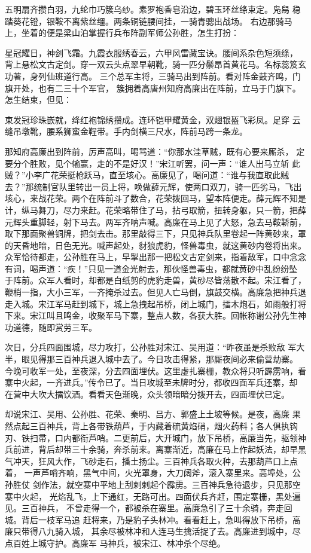 五明扇齐攒白羽，九纶巾巧簇乌纱。素罗袍香皂沿边，碧玉环丝绦束定。凫舄
稳踏葵花镫，银鞍不离紫丝缰。两条铜链腰间挂，一骑青骢出战场。
右边那骑马上，坐着的便是梁山泊掌握行兵布阵副军师公孙胜，怎生打扮：

星冠耀日，神剑飞霜。九霞衣服绣春云，六甲风雷藏宝诀。腰间系杂色短须绦，
背上悬松文古定剑。穿一双云头点翠早朝靴，骑一匹分鬃昂首黄花马。名标蕊笈玄
功著，身列仙班道行高。
三个总军主将，三骑马出到阵前。看对阵金鼓齐鸣，门旗开处，也有二三十个军官，
簇拥着高唐州知府高廉出在阵前，立马于门旗下。怎生结束，但见：

束发冠珍珠嵌就，绛红袍锦绣攒成。连环铠甲耀黄金，双翅银盔飞彩凤。足穿
云缝吊墩靴，腰系狮蛮金鞓带。手内剑横三尺水，阵前马跨一条龙。

那知府高廉出到阵前，厉声高叫，喝骂道：“你那水洼草贼，既有心要来厮杀，
定要分个胜败，见个输赢，走的不是好汉！”宋江听罢，问一声：“谁人出马立斩
此贼？”小李广花荣挺枪跃马，直至垓心。高廉见了，喝问道：“谁与我直取此贼
去？”那统制官队里转出一员上将，唤做薛元辉，使两口双刀，骑一匹劣马，飞出
垓心，来战花荣。两个在阵前斗了数合，花荣拨回马，望本阵便走。薛元辉不知是
计，纵马舞刀，尽力来赶。花荣略带住了马，拈弓取箭，扭转身躯，只一箭，把薛
元辉头重脚轻，射下马去。两军齐呐声喊。高廉在马上见了大怒，急去马鞍鞒前，
取下那面聚兽铜牌，把剑去击。那里敲得三下，只见神兵队里卷起一阵黄砂来，罩
的天昏地暗，日色无光。喊声起处，豺狼虎豹，怪兽毒虫，就这黄砂内卷将出来。
众军恰待都走，公孙胜在马上，早掣出那一把松文古定剑来，指着敌军，口中念念
有词，喝声道：“疾！”只见一道金光射去，那伙怪兽毒虫，都就黄砂中乱纷纷坠
于阵前。众军人看时，却都是白纸剪的虎豹走兽，黄砂尽皆荡散不起。宋江看了，
鞭梢一指，大小三军，一齐掩杀过去。但见人亡马倒，旗鼓交横。高廉急把神兵退
走入城。宋江军马赶到城下，城上急拽起吊桥，闭上城门，擂木炮石，如雨般打将
下来。宋江叫且鸣金，收聚军马下寨，整点人数，各获大胜。回帐称谢公孙先生神
功道德，随即赏劳三军。

次日，分兵四面围城，尽力攻打，公孙胜对宋江、吴用道：“昨夜虽是杀败敌
军大半，眼见得那三百神兵退入城中去了。今日攻击得紧，那厮夜间必来偷营劫寨。
今晚可收军一处，至夜深，分去四面埋伏。这里虚扎寨栅，教众将只听霹雳响，看
寨中火起，一齐进兵。”传令已了。当日攻城至未牌时分，都收四面军兵还寨，却
在营中大吹大擂饮酒。看看天色渐晚，众头领暗暗分拨开去，四面埋伏已定。

却说宋江、吴用、公孙胜、花荣、秦明、吕方、郭盛上土坡等候。是夜，高廉
果然点起三百神兵，背上各带铁葫芦，于内藏着硫黄焰硝，烟火药料；各人俱执钩
刃、铁扫帚，口内都衔芦哨。二更前后，大开城门，放下吊桥，高廉当先，驱领神
兵前进，背后却带三十余骑，奔杀前来。离寨渐近，高廉在马上作起妖法，却早黑
气冲天，狂风大作，飞砂走石，播土扬尘。三百神兵各取火种，去那葫芦口上点着，
一声芦哨齐响，黑气中间，火光罩身，大刀阔斧，滚入寨里来。高埠处，公孙胜仗
剑作法，就空寨中平地上刮剌剌起个霹雳。三百神兵急待退步，只见那空寨中火起，
光焰乱飞，上下通红，无路可出。四面伏兵齐赶，围定寨栅，黑处遍见。三百神兵，
不曾走得一个，都被杀在寨里。高廉急引了三十余骑，奔走回城。背后一枝军马追
赶将来，乃是豹子头林冲。看看赶上，急叫得放下吊桥，高廉只带得八九骑入城，
其余尽被林冲和人连马生擒活捉了去。高廉进到城中，尽点百姓上城守护。高廉军
马神兵，被宋江、林冲杀个尽绝。


